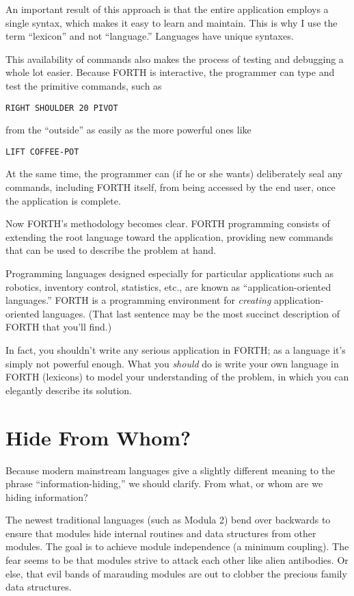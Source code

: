 An important result of this approach is that the entire application
employs a single syntax, which makes it easy to learn and maintain.
This is why I use the term {}``lexicon'' and not {}``language.''
Languages have unique syntaxes.

This availability of commands also makes the process of testing and
debugging a whole lot easier. Because FORTH is interactive, the programmer
can type and test the primitive commands, such as

\begin{verbatim}
RIGHT SHOULDER 20 PIVOT
\end{verbatim}
from the {}``outside'' as easily as the more powerful ones like

\begin{verbatim}
LIFT COFFEE-POT
\end{verbatim}
At the same time, the programmer can (if he or she wants) deliberately
seal any commands, including FORTH itself, from being accessed by
the end user, once the application is complete.

Now FORTH's methodology becomes clear. FORTH programming consists
of extending the root language toward the application, providing new
commands that can be used to describe the problem at hand.

Programming languages designed especially for particular applications
such as robotics, inventory control, statistics, etc., are known as
{}``application-oriented languages.'' FORTH is a programming environment
for \emph{creating} application-oriented languages. (That last sentence
may be the most succinct description of FORTH that you'll find.)

In fact, you shouldn't write any serious application in FORTH; as
a language it's simply not powerful enough. What you \emph{should}
do is write your own language in FORTH (lexicons) to model your understanding
of the problem, in which you can elegantly describe its solution.


\section{Hide From Whom?}

Because modern mainstream languages give a slightly different meaning
to the phrase {}``information-hiding,'' we should clarify. From
what, or whom are we hiding information?

The newest traditional languages (such as Modula 2) bend over backwards
to ensure that modules hide internal routines and data structures
from other modules. The goal is to achieve module independence (a
minimum coupling). The fear seems to be that modules strive to attack
each other like alien antibodies. Or else, that evil bands of marauding
modules are out to clobber the precious family data structures.

